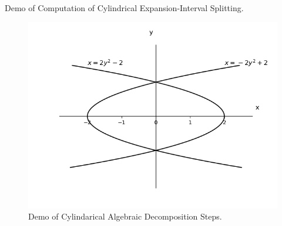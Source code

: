 \begin{example}

\end{example}

\begin{table}[]
    \centering
         {Demo of Computation of Cylindrical Expansion-Interval Splitting.}
\label{tab:expansion}
\end{table}

\begin{figure}[t]
    \centering
    \includegraphics[width=\columnwidth]{Img/cad.png}
     {Demo of Cylindarical Algebraic Decomposition Steps.}
\label{fig:CAD}
\end{figure}